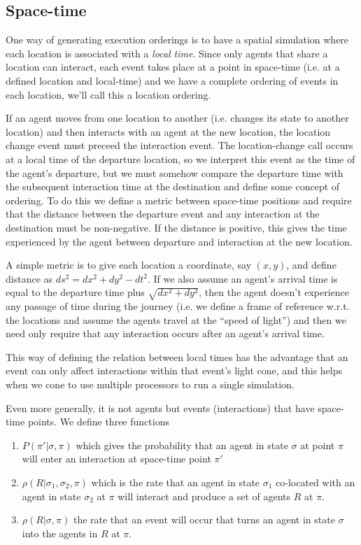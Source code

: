\documentclass[a4paper]{article}
\begin{document}
\subsection{Space-time}

One way of generating execution orderings is to have a spatial simulation where each location is associated with a \textit{local time}. Since only agents that share a location can interact, each event takes place at a point in space-time (i.e. at a defined location and local-time) and we have a complete ordering of events in each location, we'll call this a location ordering.

If an agent moves from one location to another (i.e. changes its state to another location) and then interacts with an agent at the new location, the location change event must preceed the interaction event. The location-change call occurs at a local time of the departure location, so we interpret this event as the time of the agent's departure, but we must somehow compare the departure time with the subsequent interaction time at the destination and define some concept of ordering. To do this we define a metric between space-time positions and require that the distance between the departure event and any interaction at the destination must be non-negative. If the distance is positive, this gives the time experienced by the agent between departure and interaction at the new location.

A simple metric is to give each location a coordinate, say $(x,y)$, and define distance as $ds^2 = dx^2 + dy^2 - dt^2$. If we also assume an agent's arrival time is equal to the departure time plus $\sqrt{dx^2 + dy^2}$, then the agent doesn't experience any passage of time during the journey (i.e. we define a frame of reference w.r.t. the locations and assume the agents travel at the ``speed of light'') and then we need only require that any interaction occurs after an agent's arrival time.

This way of defining the relation between local times has the advantage that an event can only affect interactions within that event's light cone, and this helps when we cone to use multiple processors to run a single simulation.

Even more generally, it is not agents but events (interactions) that have space-time points. We define three functions
\begin{enumerate}
	\item $P(\pi' | \sigma, \pi)$ which gives the probability that an agent in state $\sigma$ at point $\pi$ will enter an interaction at space-time point $\pi'$

	\item $\rho(R | \sigma_1, \sigma_2, \pi)$ which is the rate that an agent in state $\sigma_1$ co-located with an agent in state $\sigma_2$ at $\pi$ will interact and produce a set of agents $R$ at $\pi$.
	
	\item $\rho(R | \sigma, \pi)$ the rate that an event will occur that turns an agent in state $\sigma$ into the agents in $R$ at $\pi$.
\end{enumerate}	
\end{document}
